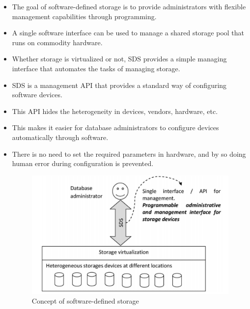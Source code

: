 \documentclass[a4paper, 12pt]{article}
\begin{document}
\begin{itemize}
\item
The goal of software-defined storage is to provide administrators with flexible management capabilities through programming.
\item
A single software interface can be used to manage a shared storage pool that runs on commodity hardware.
\item
Whether storage is virtualized or not, SDS provides a simple managing interface that automates the tasks of managing storage.
\item
SDS is a management API that provides a standard way of configuring software devices.
\item
This API hides the heterogeneity in devices, vendors, hardware, etc.
\item
This makes it easier for database administrators to configure devices automatically through software.
\item
There is no need to set the required parameters in hardware, and by so doing human error during configuration is prevented.

\begin{figure}[H]
	\centering
	\includegraphics[width=\linewidth]{sds.png}
  	\caption{Concept of software-defined storage}
	\label{fig:sds}
\end{figure}
\end{itemize}
\end{document}
